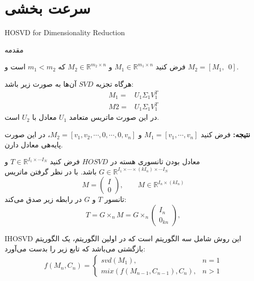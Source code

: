 \section{سرعت بخشی}
\begin{frame}[standout]
\begin{latin}
	HOSVD for Dimensionality Reduction
	\end{latin}
\end{frame}
\begin{frame}
{مقدمه}
\small{
فرض کنید 
$M_1\in \mathbb{R}^{m_1\times n}$
و
$M_2\in \mathbb{R}^{m_2\times n}$
که 
$m_1<m_2$
است و 
$M_2=[M_1,~~0]$.

هرگاه تجزیه $SVD$ آن‌ها به صورت زیر باشد:
\begin{align*}
M_1=&U_1\Sigma_1V_1^T\\
M2=&U_1\Sigma_1V_1^T
\end{align*}
در این صورت ماتریس متعامد $U_1$ معادل با $U_2$ است.

\pause
\textbf{نتیجه:}
فرض کنید 
$M_1=[v_1,\cdots,v_n]$
و
$M_2=[v_1,v_2,\cdots,0,\cdots,0,v_n]$،
در این صورت پایه‌هی معادل دارن.
}
\end{frame}
\begin{frame}{معادل بودن تانسوری هسته در $HOSVD$}
فرض کنید 
$T\in \mathbb{R}^{I_1\times\cdots I_N}$
و
$G\in \mathbb{R}^{I_1\times\cdots\times(kI_n)\times\cdots I_N}$
باشد.
با در نظر گرفتن ماتریس
\[
M=\begin{pmatrix}
I\\0
\end{pmatrix},\qquad M\in\mathbb{R}^{I_n\times (kI_n)}
\]
تانسور  $T$ و $G$ در رابطه زیر صدق می‌کند:
\[T=G\times_nM=G\times_n\begin{pmatrix}
I_n\\0_{kn}
\end{pmatrix},\]
\end{frame}
\begin{frame}{IHOSVD}
این روش شامل سه الگوریتم است که در اولین الگوریتم، یک الگوریتم بازگشتی می‌باشد که تابع زیر را بدست می‌آورد:
\begin{align*}
f(M_n,C_n)=
\begin{cases}
svd(M_1),& n=1\\
mix(f(M_{n-1},C_{n-1}),C_n),&n>1
\end{cases}
\end{align*}
\end{frame}
